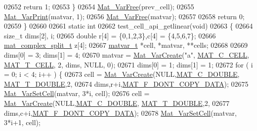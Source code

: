 \begin{DoxyCode}
{{{{{{{{02652         \textcolor{keywordflow}{return} 1;
02653     \}
02654     \hyperlink{group___m_a_t_ga1d14716f7450530fd1c9d02413787f0e}{Mat\_VarFree}(prev\_cell);
02655     \hyperlink{group___m_a_t_ga9100c145e338b84b55d5d0795d5d390a}{Mat\_VarPrint}(matvar, 1);
02656     \hyperlink{group___m_a_t_ga1d14716f7450530fd1c9d02413787f0e}{Mat\_VarFree}(matvar);
02657 
02658     \textcolor{keywordflow}{return} 0;
02659 \}
02660 
02661 \textcolor{keyword}{static} \textcolor{keywordtype}{int}
02662 test\_cell\_api\_getlinear(\textcolor{keywordtype}{void})
02663 \{
02664     \textcolor{keywordtype}{size\_t} dims[2], i;
02665     \textcolor{keywordtype}{double}    r[4] = \{0,1,2,3\},c[4] = \{4,5,6,7\};
02666     \hyperlink{group___m_a_t_structmat__complex__split__t}{mat\_complex\_split\_t} z[4];
02667     \hyperlink{group___m_a_t_structmatvar__t}{matvar\_t} *cell, *matvar, **cells;
02668 
02669     dims[0] = 3; dims[1] = 4;
02670     matvar = \hyperlink{group___m_a_t_ga1c54a84bb4d810c6fccdb8869489eac4}{Mat\_VarCreate}(\textcolor{stringliteral}{"a"}, \hyperlink{group___m_a_t_ggad4d60ae7b709fc81bfd744fb4c857c40a2f7abb47a1c51e248bd4e5e03cc81b08}{MAT\_C\_CELL}, \hyperlink{group___m_a_t_ggacf7b3b879282b7ab3a51190e49bf3453a07599cf2cca6d2b2d059378563318ba5}{MAT\_T\_CELL}, 2, dims, NULL, 0);
02671     dims[0] = 1; dims[1] = 1;
02672     \textcolor{keywordflow}{for} ( i = 0; i < 4; i++ ) \{
02673         cell = \hyperlink{group___m_a_t_ga1c54a84bb4d810c6fccdb8869489eac4}{Mat\_VarCreate}(NULL,\hyperlink{group___m_a_t_ggad4d60ae7b709fc81bfd744fb4c857c40a5d70e0862e5bdb7bd86bf7ba5948f307}{MAT\_C\_DOUBLE},
      \hyperlink{group___m_a_t_ggacf7b3b879282b7ab3a51190e49bf3453a31e721ecf7e188196f83c32838288797}{MAT\_T\_DOUBLE},2,
02674                              dims,r+i,\hyperlink{group___m_a_t_ggab9d6ef9e3ddca78a317b173f01d53fbba762244499f52eb35e7b53fb79a1f2889}{MAT\_F\_DONT\_COPY\_DATA});
02675         \hyperlink{group___m_a_t_ga1b2c36f27ba592206c22c584a30a3c5c}{Mat\_VarSetCell}(matvar, 3*i, cell);
02676         cell = \hyperlink{group___m_a_t_ga1c54a84bb4d810c6fccdb8869489eac4}{Mat\_VarCreate}(NULL,\hyperlink{group___m_a_t_ggad4d60ae7b709fc81bfd744fb4c857c40a5d70e0862e5bdb7bd86bf7ba5948f307}{MAT\_C\_DOUBLE},
      \hyperlink{group___m_a_t_ggacf7b3b879282b7ab3a51190e49bf3453a31e721ecf7e188196f83c32838288797}{MAT\_T\_DOUBLE},2,
02677                              dims,c+i,\hyperlink{group___m_a_t_ggab9d6ef9e3ddca78a317b173f01d53fbba762244499f52eb35e7b53fb79a1f2889}{MAT\_F\_DONT\_COPY\_DATA});
02678         \hyperlink{group___m_a_t_ga1b2c36f27ba592206c22c584a30a3c5c}{Mat\_VarSetCell}(matvar, 3*i+1, cell);
}}}}}}}}
\end{DoxyCode}
